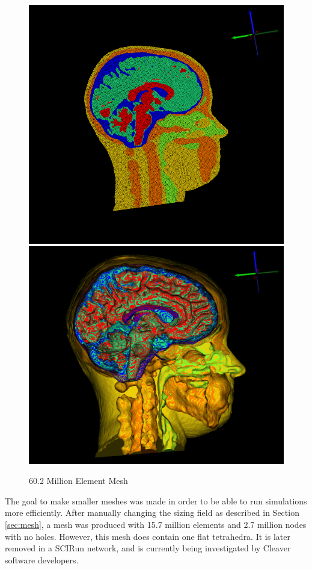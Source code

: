 \begin{figure}[H]
\begin{center}
\includegraphics[width=.49\textwidth]{Figures/bigmesh_1}
\includegraphics[width=.49\textwidth]{Figures/bigmesh_surface}
\caption{60.2 Million Element Mesh}
\label{fig:bigmesh}
\end{center}
\end{figure}

The goal to make smaller meshes was made in order to be able to run simulations more efficiently. After manually changing the sizing field as described in Section \ref{sec:mesh}, a mesh was produced with 15.7 million elements and 2.7 million nodes with no holes. However, this mesh does contain one flat tetrahedra. It is later removed in a SCIRun network, and is currently being investigated by Cleaver software developers.

